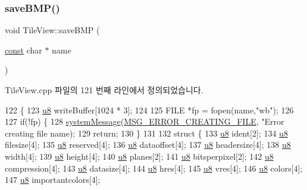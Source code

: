 \subsubsection{\texorpdfstring{save\+B\+M\+P()}{saveBMP()}}
{\footnotesize\ttfamily void Tile\+View\+::save\+B\+MP (\begin{DoxyParamCaption}\item[{\mbox{\hyperlink{getopt1_8c_a2c212835823e3c54a8ab6d95c652660e}{const}} char $\ast$}]{name }\end{DoxyParamCaption})}



Tile\+View.\+cpp 파일의 121 번째 라인에서 정의되었습니다.


\begin{DoxyCode}
122 \{
123   \mbox{\hyperlink{_system_8h_aed742c436da53c1080638ce6ef7d13de}{u8}} writeBuffer[1024 * 3];
124   
125   FILE *fp = fopen(name,\textcolor{stringliteral}{"wb"});
126 
127   \textcolor{keywordflow}{if}(!fp) \{
128     \mbox{\hyperlink{system_8cpp_a747a9cb8e015a3d45cca636b5bd0fc69}{systemMessage}}(\mbox{\hyperlink{_n_l_s_8h_a165f1f2539e202f0a24e6e9583c63475}{MSG\_ERROR\_CREATING\_FILE}}, \textcolor{stringliteral}{"Error creating file %
      name);
129     \textcolor{keywordflow}{return};
130   \}
131 
132   \textcolor{keyword}{struct }\{
133     \mbox{\hyperlink{_system_8h_aed742c436da53c1080638ce6ef7d13de}{u8}} ident[2];
134     \mbox{\hyperlink{_system_8h_aed742c436da53c1080638ce6ef7d13de}{u8}} filesize[4];
135     \mbox{\hyperlink{_system_8h_aed742c436da53c1080638ce6ef7d13de}{u8}} reserved[4];
136     \mbox{\hyperlink{_system_8h_aed742c436da53c1080638ce6ef7d13de}{u8}} dataoffset[4];
137     \mbox{\hyperlink{_system_8h_aed742c436da53c1080638ce6ef7d13de}{u8}} headersize[4];
138     \mbox{\hyperlink{_system_8h_aed742c436da53c1080638ce6ef7d13de}{u8}} width[4];
139     \mbox{\hyperlink{_system_8h_aed742c436da53c1080638ce6ef7d13de}{u8}} height[4];
140     \mbox{\hyperlink{_system_8h_aed742c436da53c1080638ce6ef7d13de}{u8}} planes[2];
141     \mbox{\hyperlink{_system_8h_aed742c436da53c1080638ce6ef7d13de}{u8}} bitsperpixel[2];
142     \mbox{\hyperlink{_system_8h_aed742c436da53c1080638ce6ef7d13de}{u8}} compression[4];
143     \mbox{\hyperlink{_system_8h_aed742c436da53c1080638ce6ef7d13de}{u8}} datasize[4];
144     \mbox{\hyperlink{_system_8h_aed742c436da53c1080638ce6ef7d13de}{u8}} hres[4];
145     \mbox{\hyperlink{_system_8h_aed742c436da53c1080638ce6ef7d13de}{u8}} vres[4];
146     \mbox{\hyperlink{_system_8h_aed742c436da53c1080638ce6ef7d13de}{u8}} colors[4];
147     \mbox{\hyperlink{_system_8h_aed742c436da53c1080638ce6ef7d13de}{u8}} importantcolors[4];
}
\end{DoxyCode}
